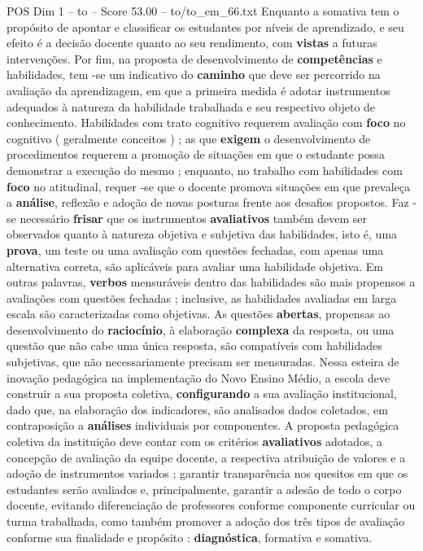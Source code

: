 \begin{textsample}{POS Dim 1 – to – Score 53.00 – to/to\_em\_66.txt}
Enquanto a somativa tem o propósito de apontar e classificar os estudantes por níveis de aprendizado, e seu efeito é a decisão docente quanto ao seu rendimento, com \textbf{vistas} a futuras intervenções.
Por fim, na proposta de desenvolvimento de \textbf{competências} e habilidades, tem -se um indicativo do \textbf{caminho} que deve ser percorrido na avaliação da aprendizagem, em que a primeira medida é adotar instrumentos adequados à natureza da habilidade trabalhada e seu respectivo objeto de conhecimento.
Habilidades com trato cognitivo requerem avaliação com \textbf{foco} no cognitivo ( geralmente conceitos ) ; as que \textbf{exigem} o desenvolvimento de procedimentos requerem a promoção de situações em que o estudante possa demonstrar a execução do mesmo ; enquanto, no trabalho com habilidades com \textbf{foco} no atitudinal, requer -se que o docente promova situações em que prevaleça a \textbf{análise}, reflexão e adoção de novas posturas frente aos desafios propostos.
Faz -se necessário \textbf{frisar} que os instrumentos \textbf{avaliativos} também devem ser observados quanto à natureza objetiva e subjetiva das habilidades, isto é, uma \textbf{prova}, um teste ou uma avaliação com questões fechadas, com apenas uma alternativa correta, são aplicáveis para avaliar uma habilidade objetiva.
Em outras palavras, \textbf{verbos} mensuráveis dentro das habilidades são mais propensos a avaliações com questões fechadas ; inclusive, as habilidades avaliadas em larga escala são caracterizadas como objetivas.
As questões \textbf{abertas}, propensas ao desenvolvimento do \textbf{raciocínio}, à elaboração \textbf{complexa} da resposta, ou uma questão que não cabe uma única resposta, são compatíveis com habilidades subjetivas, que não necessariamente precisam ser mensuradas.
Nessa esteira de inovação pedagógica na implementação do Novo Ensino Médio, a escola deve construir a sua proposta coletiva, \textbf{configurando} a sua avaliação institucional, dado que, na elaboração dos indicadores, são analisados dados coletados, em contraposição a \textbf{análises} individuais por componentes.
A proposta pedagógica coletiva da instituição deve contar com os critérios \textbf{avaliativos} adotados, a concepção de avaliação da equipe docente, a respectiva atribuição de valores e a adoção de instrumentos variados ; garantir transparência nos quesitos em que os estudantes serão avaliados e, principalmente, garantir a adesão de todo o corpo docente, evitando diferenciação de professores conforme componente curricular ou turma trabalhada, como também promover a adoção dos três tipos de avaliação conforme sua finalidade e propósito : \textbf{diagnóstica}, formativa e somativa.

\end{textsample}
